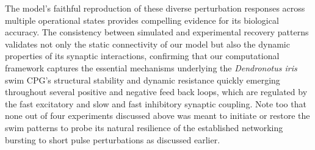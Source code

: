 \documentclass[nofootinbib,aip,amsmath,amssymb,reprint,twocolumn,10pt]{revtex4-2}
\begin{document}
The model's faithful reproduction of these diverse perturbation responses across multiple operational states provides compelling evidence for its biological accuracy. The consistency between simulated and experimental recovery patterns validates not only the static connectivity of our model but also the dynamic properties of its synaptic interactions, confirming that our computational framework captures the essential mechanisms underlying the \textit{Dendronotus iris} swim CPG's structural stability and dynamic resistance quickly emerging throughout several positive and negative feed back loops, which are regulated by the fast excitatory and slow and fast inhibitory synaptic coupling. Note too that none out of four experiments discussed above was meant to initiate or restore the swim patterns to probe its natural resilience of the established networking bursting to short pulse perturbations as discussed earlier. 
\end{document}
